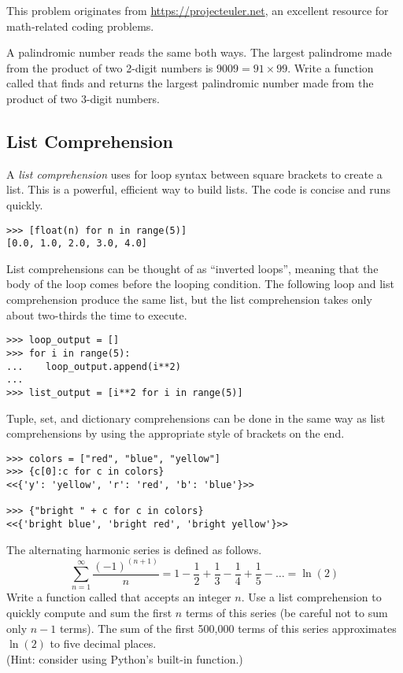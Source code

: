 \begin{problem} %
This problem originates from \url{https://projecteuler.net}, an excellent resource for math-related coding problems.

A palindromic number reads the same both ways.
The largest palindrome made from the product of two 2-digit numbers is $9009 = 91 \times 99.$
Write a function called  that finds and returns the largest palindromic number made from the product of two 3-digit numbers.
\end{problem}

\subsection*{List Comprehension} %

A \emph{list comprehension} uses for loop syntax between square brackets to create a list.
This is a powerful, efficient way to build lists.
The code is concise and runs quickly.

\begin{lstlisting}
>>> [float(n) for n in range(5)]
[0.0, 1.0, 2.0, 3.0, 4.0]
\end{lstlisting}

List comprehensions can be thought of as ``inverted loops'', meaning that the body of the loop comes before the looping condition.
The following loop and list comprehension produce the same list, but the list comprehension takes only about two-thirds the time to execute.

\begin{lstlisting}
>>> loop_output = []
>>> for i in range(5):
...    loop_output.append(i**2)
...
>>> list_output = [i**2 for i in range(5)]
\end{lstlisting}

Tuple, set, and dictionary comprehensions can be done in the same way as list comprehensions by using the appropriate style of brackets on the end.

\begin{lstlisting}
>>> colors = ["red", "blue", "yellow"]
>>> {c[0]:c for c in colors}
<<{'y': 'yellow', 'r': 'red', 'b': 'blue'}>>

>>> {"bright " + c for c in colors}
<<{'bright blue', 'bright red', 'bright yellow'}>>
\end{lstlisting}

\begin{problem} %
The alternating harmonic series is defined as follows.
\[\sum_{n=1}^\infty \frac{(-1)^{(n+1)}}{n} = 1 - \frac{1}{2} + \frac{1}{3} - \frac{1}{4} + \frac{1}{5} - \ldots = \ln(2)\]
Write a function called  that accepts an integer $n$.
Use a list comprehension to quickly compute and sum the first $n$ terms of this series (be careful not to sum only $n-1$ terms).
The sum of the first 500,000 terms of this series approximates $\ln(2)$ to five decimal places.
\\(Hint: consider using Python's built-in  function.)
\end{problem}

